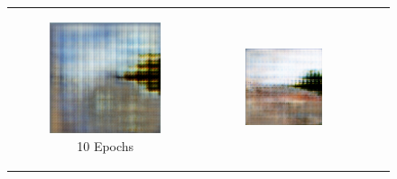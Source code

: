 \documentclass{article}
\begin{document}
\begin{figure}[H]
    \centering
    \begin{tabular}{cccc}
        \begin{subfigure}{0.23\textwidth}
            \centering
            \includegraphics[width=\linewidth]{world_epoch_10_11.png}
            \caption{10 Epochs}
        \end{subfigure} &
        \begin{subfigure}{0.23\textwidth}
            \centering
            \includegraphics[width=\linewidth]{world_epoch_25_11.png}

\end{subfigure}
\end{tabular}
\end{figure}
\end{document}
